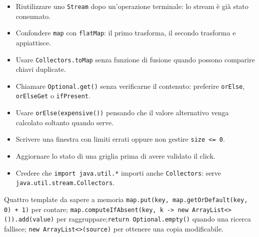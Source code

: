 ﻿\documentclass[10pt,a4paper]{article}
\newcommand{\cmd}[1]{\texttt{#1}}
\newenvironment{topicblock}{%
  \par\medskip\noindent\begin{minipage}{\textwidth}%
}{%
  \end{minipage}\par\medskip%
}
\begin{document}
\begin{topicblock}
\begin{itemize}
\item Riutilizzare uno \cmd{Stream} dopo un'operazione terminale: lo stream è già stato consumato.
\item Confondere \cmd{map} con \cmd{flatMap}: il primo trasforma, il secondo trasforma e appiattisce.
\item Usare \cmd{Collectors.toMap} senza funzione di fusione quando possono comparire chiavi duplicate.
\item Chiamare \cmd{Optional.get()} senza verificarne il contenuto: preferire \cmd{orElse}, \cmd{orElseGet} o \cmd{ifPresent}.
\item Usare \cmd{orElse(expensive())} pensando che il valore alternativo venga calcolato soltanto quando serve.
\item Scrivere una finestra con limiti errati oppure non gestire \cmd{size <= 0}.
\item Aggiornare lo stato di una griglia prima di avere validato il click.
\item Credere che \cmd{import java.util.*} importi anche \cmd{Collectors}: serve \cmd{java.util.stream.Collectors}.
\end{itemize}

\begin{examtrap}{Quattro template da sapere a memoria}
\cmd{map.put(key, map.getOrDefault(key, 0) + 1)} per contare;\quad
\cmd{map.computeIfAbsent(key, k -> new ArrayList<>()).add(value)} per
raggruppare;\quad \cmd{return Optional.empty()} quando una ricerca fallisce;\quad
\cmd{new ArrayList<>(source)} per ottenere una copia modificabile.
\end{examtrap}

\end{topicblock}
\end{document}
